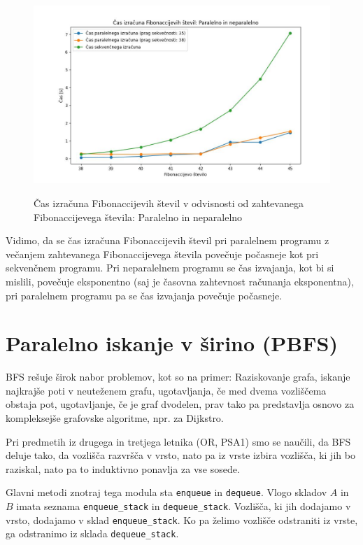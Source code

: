 \documentclass[mat1, tisk]{fmfdelo}
\begin{document}
\begin{figure}[h!]
  \centering
  \caption{Čas izračuna Fibonaccijevih števil v odvisnosti od zahtevanega Fibonaccijevega števila: Paralelno in neparalelno}
  \includegraphics[width=15cm]{slike/fib_par_v_odvisnosti_od_n.jpg}
  \label{fig:fib_par_v_odvisnosti_od_n}
\end{figure}

Vidimo, da se čas izračuna Fibonaccijevih števil pri paralelnem programu z večanjem zahtevanega Fibonaccijevega števila
povečuje počasneje kot pri sekvenčnem programu. Pri neparalelnem programu se čas izvajanja, kot bi
si mislili, povečuje eksponentno (saj je časovna zahtevnost računanja eksponentna), pri paralelnem programu pa se čas
izvajanja povečuje počasneje.

\section{Paralelno iskanje v širino (PBFS)}

BFS rešuje širok nabor problemov, kot so na primer: Raziskovanje grafa, iskanje najkrajše poti v neuteženem grafu, 
ugotavljanja, če med dvema vozliščema obstaja pot, ugotavljanje, če je graf dvodelen, prav tako pa predstavlja osnovo
za kompleksejše grafovske algoritme, npr. za Dijkstro.

Pri predmetih iz drugega in tretjega letnika (OR, PSA1) smo se naučili, da BFS deluje tako, da vozlišča razvršča
v vrsto, nato pa iz vrste izbira vozlišča, ki jih bo raziskal, nato pa to induktivno ponavlja za vse sosede.


Glavni metodi znotraj tega modula sta \texttt{enqueue} in \texttt{dequeue}. Vlogo skladov $A$ in $B$ imata
seznama \texttt{enqueue\_stack} in \texttt{dequeue\_stack}. Vozlišča, ki jih dodajamo v vrsto, dodajamo v sklad
\texttt{enqueue\_stack}. Ko pa želimo vozlišče odstraniti iz vrste, ga odstranimo iz sklada \texttt{dequeue\_stack}.
\end{document}
